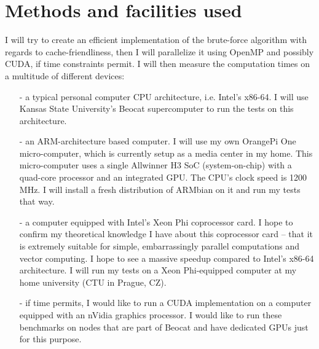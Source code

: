 \documentclass[journal]{IEEEtran}
\begin{document}
	\section{Methods and facilities used}
		I will try to create an efficient implementation of the brute-force algorithm with regards to cache-friendliness, then I will parallelize it using OpenMP and possibly CUDA, if time constraints permit. 
		I will then measure the computation times on a multitude of different devices:
		\begin{itemize}  
			\item[-]{a typical personal computer CPU architecture, i.e. Intel’s x86-64. I will use Kansas State University’s Beocat supercomputer to run the tests on this architecture.}
			\item[-]{an ARM-architecture based computer. I will use my own OrangePi One micro-computer, which is currently setup as a media center in my home. This micro-computer uses a single Allwinner H3 SoC (system-on-chip) with a quad-core processor and an integrated GPU. The CPU's clock speed is 1200 MHz. I will install a fresh distribution of ARMbian on it and run my tests that way.}
			\item[-]{a computer equipped with Intel’s Xeon Phi coprocessor card. I hope to confirm my theoretical knowledge I have about this coprocessor card – that it is extremely suitable for simple, embarrassingly parallel computations and vector computing. I hope to see a massive speedup compared to Intel’s x86-64 architecture. I will run my tests on a Xeon Phi-equipped computer at my home university (CTU in Prague, CZ).}
			\item[-]{if time permits, I would like to run a CUDA implementation on a computer equipped with an nVidia graphics processor. I would like to run these benchmarks on nodes that are part of Beocat and have dedicated GPUs just for this purpose.}
		\end{itemize}
	
\end{document}

